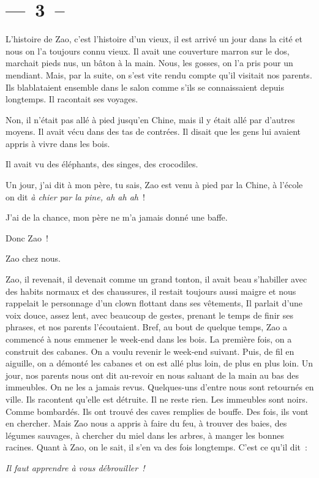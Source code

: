 \documentclass[french,twoside]{book} %
\begin{document}
\section[{— 3 –}]{— 3 –}\renewcommand{\leftmark}{— 3 –}

\noindent L’histoire de Zao, c’est l’histoire d’un vieux, il est arrivé un jour dans la cité et nous on l’a toujours connu vieux. Il avait une couverture marron sur le dos, marchait pieds nus, un bâton à la main. Nous, les gosses, on l’a pris pour un mendiant. Mais, par la suite, on s’est vite rendu compte qu’il visitait nos parents. Ils blablataient ensemble dans le salon comme s’ils se connaissaient depuis longtemps. Il racontait ses voyages.\par
Non, il n’était pas allé à pied jusqu’en Chine, mais il y était allé par d’autres moyens. Il avait vécu dans des tas de contrées. Il disait que les gens lui avaient appris à vivre dans les bois.\par
Il avait vu des éléphants, des singes, des crocodiles.\par
Un jour, j’ai dit à mon père, tu sais, Zao est venu à pied par la Chine, à l’école on dit \emph{à chier par la pine, ah ah ah} !\par
J’ai de la chance, mon père ne m’a jamais donné une baffe.\par
Donc Zao !\par
Zao chez nous.\par
Zao, il revenait, il devenait comme un grand tonton, il avait beau s’habiller avec des habits normaux et des chaussures, il restait toujours aussi maigre et nous rappelait le personnage d’un clown flottant dans ses vêtements, Il parlait d’une voix douce, assez lent, avec beaucoup de gestes, prenant le temps de finir ses phrases, et nos parents l’écoutaient. Bref, au bout de quelque temps, Zao a commencé à nous emmener le week-end dans les bois. La première fois, on a construit des cabanes. On a voulu revenir le week-end suivant. Puis, de fil en aiguille, on a démonté les cabanes et on est allé plus loin, de plus en plus loin. Un jour, nos parents nous ont dit au-revoir en nous saluant de la main au bas des immeubles. On ne les a jamais revus. Quelques-uns d’entre nous sont retournés en ville. Ils racontent qu’elle est détruite. Il ne reste rien. Les immeubles sont noirs. Comme bombardés. Ils ont trouvé des caves remplies de bouffe. Des fois, ils vont en chercher. Mais Zao nous a appris à faire du feu, à trouver des baies, des légumes sauvages, à chercher du miel dans les arbres, à manger les bonnes racines. Quant à Zao, on le sait, il s’en va des fois longtemps. C’est ce qu’il dit :\par
{\itshape Il faut apprendre à vous débrouiller !}
\end{document}

